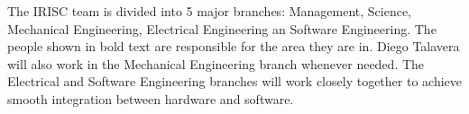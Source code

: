 The IRISC team is divided into 5 major branches: Management, Science, Mechanical Engineering, Electrical Engineering an Software Engineering. The people shown in bold text are responsible for the area they are in. Diego Talavera will also work in the Mechanical Engineering branch whenever needed. The Electrical and Software Engineering branches will work closely together to achieve smooth integration between hardware and software.

